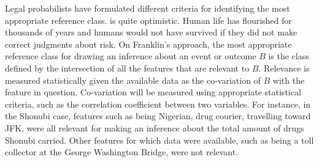 \documentclass{article}
\begin{document}
Legal probabilists have formulated different criteria for identifying the most appropriate reference class.  \citet{franklin2011objective} is quite optimistic. %
Human life has flourished for thousands of years and humans would not have survived if they did not make correct judgments about risk. 
On Franklin's approach, 
the most appropriate reference class for drawing an inference about an event or outcome $B$ is the class defined by the intersection of all the features that are relevant to $B$. Relevance is 
measured statistically given the available data as the co-variation of $B$ with  the feature in question. 
Co-variation will be measured using appropriate statistical criteria, such as the correlation coefficient between two variables. 
For instance, in  the Shonubi case,  features  such as being Nigerian, drug courier, travelling toward JFK, were all relevant for making an inference about the total amount of drugs Shonubi carried.  Other features for which data were available, such as being a toll collector at the George Washington Bridge, were not relevant. 
\end{document}
